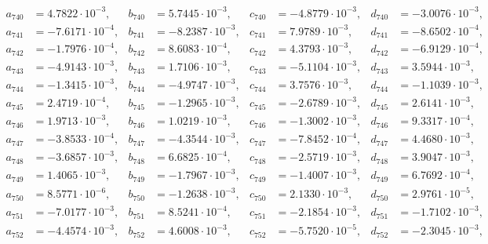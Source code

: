 \begin{align*}
  a_{ 740 } &= 4.7822 \cdot 10^{ -3 }, & b_{ 740 } &= 5.7445 \cdot 10^{ -3 }, & c_{ 740 } &= -4.8779 \cdot 10^{ -3 }, & d_{ 740 } &= -3.0076 \cdot 10^{ -3 }, \\ 
  a_{ 741 } &= -7.6171 \cdot 10^{ -4 }, & b_{ 741 } &= -8.2387 \cdot 10^{ -3 }, & c_{ 741 } &= 7.9789 \cdot 10^{ -3 }, & d_{ 741 } &= -8.6502 \cdot 10^{ -4 }, \\ 
  a_{ 742 } &= -1.7976 \cdot 10^{ -4 }, & b_{ 742 } &= 8.6083 \cdot 10^{ -4 }, & c_{ 742 } &= 4.3793 \cdot 10^{ -3 }, & d_{ 742 } &= -6.9129 \cdot 10^{ -4 }, \\ 
  a_{ 743 } &= -4.9143 \cdot 10^{ -3 }, & b_{ 743 } &= 1.7106 \cdot 10^{ -3 }, & c_{ 743 } &= -5.1104 \cdot 10^{ -3 }, & d_{ 743 } &= 3.5944 \cdot 10^{ -3 }, \\ 
  a_{ 744 } &= -1.3415 \cdot 10^{ -3 }, & b_{ 744 } &= -4.9747 \cdot 10^{ -3 }, & c_{ 744 } &= 3.7576 \cdot 10^{ -3 }, & d_{ 744 } &= -1.1039 \cdot 10^{ -3 }, \\ 
  a_{ 745 } &= 2.4719 \cdot 10^{ -4 }, & b_{ 745 } &= -1.2965 \cdot 10^{ -3 }, & c_{ 745 } &= -2.6789 \cdot 10^{ -3 }, & d_{ 745 } &= 2.6141 \cdot 10^{ -3 }, \\ 
  a_{ 746 } &= 1.9713 \cdot 10^{ -3 }, & b_{ 746 } &= 1.0219 \cdot 10^{ -3 }, & c_{ 746 } &= -1.3002 \cdot 10^{ -3 }, & d_{ 746 } &= 9.3317 \cdot 10^{ -4 }, \\ 
  a_{ 747 } &= -3.8533 \cdot 10^{ -4 }, & b_{ 747 } &= -4.3544 \cdot 10^{ -3 }, & c_{ 747 } &= -7.8452 \cdot 10^{ -4 }, & d_{ 747 } &= 4.4680 \cdot 10^{ -3 }, \\ 
  a_{ 748 } &= -3.6857 \cdot 10^{ -3 }, & b_{ 748 } &= 6.6825 \cdot 10^{ -4 }, & c_{ 748 } &= -2.5719 \cdot 10^{ -3 }, & d_{ 748 } &= 3.9047 \cdot 10^{ -3 }, \\ 
  a_{ 749 } &= 1.4065 \cdot 10^{ -3 }, & b_{ 749 } &= -1.7967 \cdot 10^{ -3 }, & c_{ 749 } &= -1.4007 \cdot 10^{ -3 }, & d_{ 749 } &= 6.7692 \cdot 10^{ -4 }, \\ 
  a_{ 750 } &= 8.5771 \cdot 10^{ -6 }, & b_{ 750 } &= -1.2638 \cdot 10^{ -3 }, & c_{ 750 } &= 2.1330 \cdot 10^{ -3 }, & d_{ 750 } &= 2.9761 \cdot 10^{ -5 }, \\ 
  a_{ 751 } &= -7.0177 \cdot 10^{ -3 }, & b_{ 751 } &= 8.5241 \cdot 10^{ -4 }, & c_{ 751 } &= -2.1854 \cdot 10^{ -3 }, & d_{ 751 } &= -1.7102 \cdot 10^{ -3 }, \\ 
  a_{ 752 } &= -4.4574 \cdot 10^{ -3 }, & b_{ 752 } &= 4.6008 \cdot 10^{ -3 }, & c_{ 752 } &= -5.7520 \cdot 10^{ -5 }, & d_{ 752 } &= -2.3045 \cdot 10^{ -3 }, \\ 

\end{align*}
